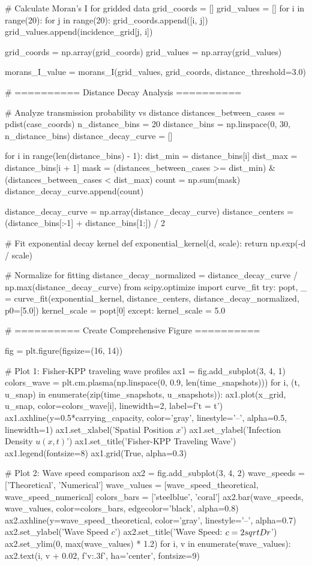 \documentclass[a4paper, 11pt]{article}
\begin{document}
\begin{pycode}
# Calculate Moran's I for gridded data
grid_coords = []
grid_values = []
for i in range(20):
    for j in range(20):
        grid_coords.append([i, j])
        grid_values.append(incidence_grid[j, i])

grid_coords = np.array(grid_coords)
grid_values = np.array(grid_values)

morans_I_value = morans_I(grid_values, grid_coords, distance_threshold=3.0)

# ========== Distance Decay Analysis ==========

# Analyze transmission probability vs distance
distances_between_cases = pdist(case_coords)
n_distance_bins = 20
distance_bins = np.linspace(0, 30, n_distance_bins)
distance_decay_curve = []

for i in range(len(distance_bins) - 1):
    dist_min = distance_bins[i]
    dist_max = distance_bins[i + 1]
    mask = (distances_between_cases >= dist_min) & (distances_between_cases < dist_max)
    count = np.sum(mask)
    distance_decay_curve.append(count)

distance_decay_curve = np.array(distance_decay_curve)
distance_centers = (distance_bins[:-1] + distance_bins[1:]) / 2

# Fit exponential decay kernel
def exponential_kernel(d, scale):
    return np.exp(-d / scale)

# Normalize for fitting
distance_decay_normalized = distance_decay_curve / np.max(distance_decay_curve)
from scipy.optimize import curve_fit
try:
    popt, _ = curve_fit(exponential_kernel, distance_centers,
                       distance_decay_normalized, p0=[5.0])
    kernel_scale = popt[0]
except:
    kernel_scale = 5.0

# ========== Create Comprehensive Figure ==========

fig = plt.figure(figsize=(16, 14))

# Plot 1: Fisher-KPP traveling wave profiles
ax1 = fig.add_subplot(3, 4, 1)
colors_wave = plt.cm.plasma(np.linspace(0, 0.9, len(time_snapshots)))
for i, (t, u_snap) in enumerate(zip(time_snapshots, u_snapshots)):
    ax1.plot(x_grid, u_snap, color=colors_wave[i], linewidth=2, label=f't = {t}')
ax1.axhline(y=0.5*carrying_capacity, color='gray', linestyle='--', alpha=0.5, linewidth=1)
ax1.set_xlabel('Spatial Position $x$')
ax1.set_ylabel('Infection Density $u(x,t)$')
ax1.set_title('Fisher-KPP Traveling Wave')
ax1.legend(fontsize=8)
ax1.grid(True, alpha=0.3)

# Plot 2: Wave speed comparison
ax2 = fig.add_subplot(3, 4, 2)
wave_speeds = ['Theoretical', 'Numerical']
wave_values = [wave_speed_theoretical, wave_speed_numerical]
colors_bars = ['steelblue', 'coral']
ax2.bar(wave_speeds, wave_values, color=colors_bars, edgecolor='black', alpha=0.8)
ax2.axhline(y=wave_speed_theoretical, color='gray', linestyle='--', alpha=0.7)
ax2.set_ylabel('Wave Speed $c$')
ax2.set_title('Wave Speed: $c = 2\\sqrt{Dr}$')
ax2.set_ylim(0, max(wave_values) * 1.2)
for i, v in enumerate(wave_values):
    ax2.text(i, v + 0.02, f'{v:.3f}', ha='center', fontsize=9)


\end{pycode}
\end{document}
